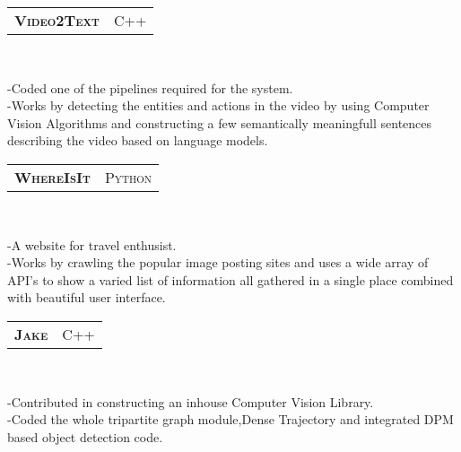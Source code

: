 \documentclass[10pt,letterpaper,oneside]{article}
\begin{document}
    \begin{tabular}{c|c}
        \textbf{\normalsize V\textsc{ideo}2T\textsc{ext}}
        &\textmd{\normalsize C\textsc{++}}
    \end{tabular}\\
    \vspace{-4mm}
    \begin{adjustwidth}{7pt}{0pt}
        {\footnotesize -Coded one of the pipelines required
        for the system.\\
        -Works by detecting the entities and actions in the
        video by using Computer Vision Algorithms and constructing a few
        semantically meaningfull sentences describing the video
        based on language models.}\\
    \end{adjustwidth}
    \vspace{-6pt}
    \begin{tabular}{c|c}
        \textbf{\normalsize W\textsc{here}I\textsc{s}I\textsc{t}}
        &\textmd{\normalsize P\textsc{ython}}
    \end{tabular}\\
     \vspace{-4mm}
    \begin{adjustwidth}{7pt}{0pt}
        {\footnotesize -A website for travel
        enthusist.\\
        -Works by crawling the popular image posting sites and
        uses a wide array of API's to show a varied list of
        information all gathered in a single place combined with
        beautiful user interface. }\\
    \end{adjustwidth}
    \vspace{-6pt}
    \begin{tabular}{c|c}
        \textbf{\normalsize J\textsc{ake}}
        &\textmd{\normalsize C\textsc{++}}
    \end{tabular}\\
     \vspace{-4mm}
    \begin{adjustwidth}{7pt}{0pt}
        {\footnotesize -Contributed in constructing an inhouse
        Computer Vision Library.\\
        -Coded the whole tripartite graph module,Dense
        Trajectory and integrated DPM based object detection code.}\\
    \end{adjustwidth}
    \vspace{-6pt}
\end{document}
